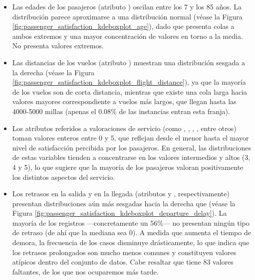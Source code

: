 \begin{itemize}

    \item Las edades de los pasajeros (atributo ) oscilan entre los 7 y los 85 años. La distribución parece aproximarse a una distribución normal (véase la Figura \ref{fig:passenger_satisfaction_kdeboxplot_age}), dado que presenta colas a ambos extremos y una mayor concentración de valores en torno a la media. No presenta valores extremos.
    
    \item Las distancias de los vuelos (atributo ) muestran una distribución sesgada a la derecha (véase la Figura \ref{fig:passenger_satisfaction_kdeboxplot_flight_distance}), ya que la mayoría de los vuelos son de corta distancia, mientras que existe una cola larga hacia valores mayores correspondiente a vuelos más largos, que llegan hasta las 4000-5000 millas (apenas el 0.08\% de las instancias entran esta franja). 
    
    \item Los atributos referidos a valoraciones de servicio (como , , , , entre otros) toman valores enteros entre 0 y 5, que reflejan desde el menor hasta el mayor nivel de satisfacción percibida por los pasajeros. En general, las distribuciones de estas variables tienden a concentrarse en los valores intermedios y altos (3, 4 y 5), lo que sugiere que la mayoría de los pasajeros valoran positivamente los distintos aspectos del servicio. 
    
    \item Los retrasos en la salida y en la llegada (atributos  y , respectivamente) presentan distribuciones aún más sesgadas hacia la derecha que  (véase la Figura \ref{fig:passenger_satisfaction_kdeboxplot_departure_delay}). La mayoría de los registros ---concretamente un 56\%--- no presentan ningún tipo de retraso (de ahí que la mediana sea 0). A medida que aumenta el tiempo de demora, la frecuencia de los casos disminuye drásticamente, lo que indica que los retrasos prolongados son mucho menos comunes y constituyen valores atípicos dentro del conjunto de datos. Cabe resaltar que  tiene 83 valores faltantes, de los que nos ocuparemos más tarde.

\end{itemize}

